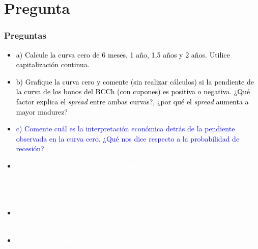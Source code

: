 \documentclass{beamer}
\begin{document}
\section{Pregunta }
\begin{frame}
  \frametitle{Preguntas}
  \begin{itemize}
    \scriptsize
    \item {\textcolor{black}{a) Calcule la curva cero de 6 meses, 1 año, 1,5 años y 2 años. Utilice capitalización continua.}}
    \vspace{3pt}
    \item {\textcolor{black}{b) Grafique la curva cero y comente (sin realizar cálculos) si la pendiente de la curva de los bonos del BCCh (con cupones) es positiva o negativa. ¿Qué factor explica el \textit{spread} entre ambas curvas?, ¿por qué el \textit{spread} aumenta a mayor madurez?}}
    \vspace{3pt}
    \item {\Large\textcolor{blue}{c) Comente cuál es la interpretación económica detrás de la pendiente observada en la curva cero. ¿Qué nos dice respecto a la probabilidad de recesión?}}
    \vspace{3pt}
    \item {\textcolor{white}{d) Considerando que usted tiene la información de la curva cero, la curva \textit{forward} y la curva de las \textit{yields} de los bonos de gobierno. Señale qué curva usaría para calcular el valor presente de las ganancias o pérdidas de los contratos \textit{forward}.}}
    \vspace{3pt}
    \item {\textcolor{white}{e) ¿Cuál es el rol de las probabilidades neutrales al riesgo en d)?, ¿qué rol juega la condición de no arbitraje?}}
    \vspace{3pt}
    \item {\textcolor{white}{f) Calcule el punto a) utilizando matrices en Excel/R/Python.}}
    \vspace{3pt}
  \end{itemize}
\end{frame}
\end{document}
